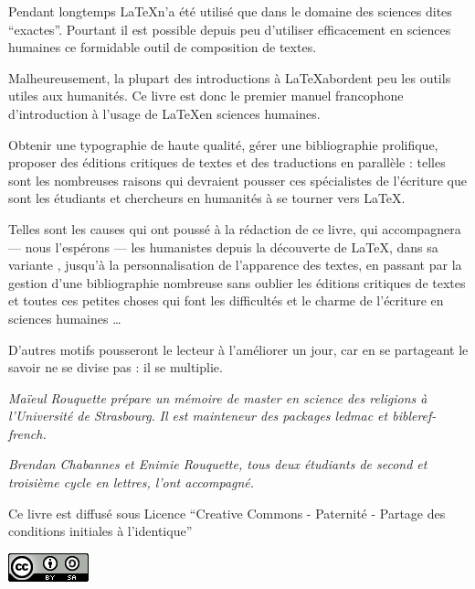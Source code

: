 \thispagestyle{empty}

Pendant longtemps \LaTeX n'a été utilisé que dans le domaine des sciences dites \enquote{exactes}.
Pourtant il est possible depuis peu d'utiliser efficacement en sciences humaines ce formidable outil de composition de textes.

Malheureusement, la plupart des introductions à \LaTeX abordent peu les outils utiles aux humanités. Ce livre est donc le premier manuel francophone d'introduction à l'usage de \LaTeX en sciences humaines.

Obtenir une typographie de haute qualité, gérer une bibliographie prolifique, proposer des éditions critiques de textes et des traductions en parallèle : telles sont les nombreuses raisons qui devraient pousser ces spécialistes de l'écriture que sont les étudiants et chercheurs en humanités à se tourner vers \LaTeX.

Telles sont les causes qui ont poussé à la rédaction de ce livre, qui accompagnera --- nous l'espérons --- les humanistes depuis la découverte de \LaTeX, dans sa variante \XeLaTeX, jusqu'à la personnalisation de l'apparence des textes, en passant par la gestion d'une bibliographie nombreuse sans oublier les éditions critiques de textes et toutes ces petites choses qui font les difficultés et le charme de l'écriture en sciences humaines \ldots

D'autres motifs pousseront le lecteur à l'améliorer un jour, car en se partageant le savoir ne se divise pas : il se multiplie.

\vspace{4ex}

\scriptsize
\emph{
Maïeul Rouquette prépare un mémoire de master en science des religions à l'Université de Strasbourg.} 
\emph{Il est mainteneur des packages \emph{ledmac} et \emph{bibleref-french}.}


\emph{Brendan Chabannes et Enimie Rouquette, tous deux étudiants  de second et troisième cycle en lettres, l'ont accompagné.}

\normalsize

\vspace{4ex}
Ce livre est diffusé sous Licence \enquote{Creative Commons - Paternité - Partage des conditions initiales à l'identique}

\vspace{2ex}
 \raggedleft\includegraphics[height=3ex]{images/cc.png}
